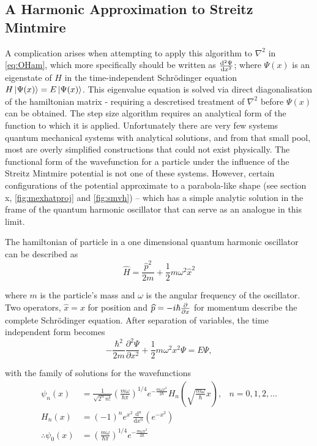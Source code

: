 \subsection{A Harmonic Approximation to Streitz Mintmire}\label{subsec:harmsm}

A complication arises when attempting to apply this algorithm to $\nabla^2$ in \cref{eq:OHam}, which more specifically should be written as $\cramped{\frac{\mathrm{d}^2\Psi}{\mathrm{d}x^2}}$; where $\Psi(x)$ is an eigenstate of $H$ in the time-independent Schr\"odinger equation $H\left\lvert \Psi(x) \right\rangle = E\left\lvert \Psi(x) \right\rangle$.
This eigenvalue equation is solved via direct diagonalisation of the hamiltonian matrix - requiring a descretised treatment of $\nabla^2$ before $\Psi(x)$ can be obtained.
The step size algorithm requires an analytical form of the function to which it is applied.
Unfortunately there are very few systems quantum mechanical systems with analytical solutions, and from that small pool, most are overly simplified constructions that could not exist physically.
The functional form of the wavefunction for a particle under the influence of the Streitz Mintmire potential is not one of these systems.
However, certain configurations of the potential approximate to a parabola-like shape (see section x, \cref{fig:mexhatproj} and \cref{fig:smvh}) -- which has a simple analytic solution in the frame of the quantum harmonic oscillator that can serve as an analogue in this limit.

The hamiltonian of particle in a one dimensional quantum harmonic oscillator can be described as
\begin{equation}
\widehat{H} = \frac{\widehat{p}^2}{2m}+\frac{1}{2}m\omega^2\widehat{x}^2\label{eq:hamho}
\end{equation}

where $m$ is the particle's mass and $ω$ is the angular frequency of the oscillator.
Two operators, $\widehat{x} = x$ for position and $\cramped{\widehat{p} = -i\hbar \frac{\partial}{\partial x}}$ for momentum describe the complete Schr\"{o}dinger equation.
After separation of variables, the time independent form becomes
\begin{equation}
-\frac{\hbar^2}{2m}\frac{\partial^2 \Psi}{\partial x^2}+\frac{1}{2}m\omega^2x^2 \Psi = E\Psi,
\label{eq:hamti}
\end{equation}

with the family of solutions for the wavefunctions
\begin{align}\psi_n(x) &= \frac{1}{\sqrt{2^n\,n!}}\left(\frac{m\omega}{\hbar\pi}\right)^{1/4}e^{
- \frac{m\omega x^2}{2 \hbar}} H_n\left(\sqrt{\frac{m\omega}{\hbar}} x \right), &n = 0,1,2,\ldots \\
H_n(x) &= (-1)^n e^{x^2}\frac{\mathrm{d}^n}{\mathrm{d}x^n}\left(e^{-x^2}\right) \\
\therefore \psi_0(x) &= \left(\frac{m\omega}{\hbar\pi}\right)^{1/4}e^{
- \frac{m\omega x^2}{2 \hbar}} \label{eq:gshwfn}
\end{align}

